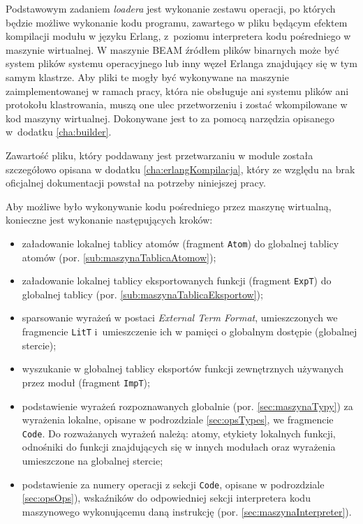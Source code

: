 Podstawowym zadaniem \emph{loadera} jest wykonanie zestawu operacji, po których będzie możliwe wykonanie kodu programu, zawartego w pliku będącym efektem kompilacji modułu w języku Erlang, z~poziomu interpretera kodu pośredniego w maszynie wirtualnej.
W maszynie BEAM źródłem plików binarnych może być system plików systemu operacyjnego lub inny węzeł Erlanga znajdujący się w tym samym klastrze. Aby pliki te mogły być wykonywane na maszynie zaimplementowanej w ramach pracy, która nie obsługuje ani systemu plików ani protokołu klastrowania, muszą one ulec przetworzeniu i zostać wkompilowane w kod maszyny wirtualnej. Dokonywane jest to za pomocą narzędzia opisanego w~dodatku \ref{cha:builder}.

Zawartość pliku, który poddawany jest przetwarzaniu w module została szczegółowo opisana w dodatku \ref{cha:erlangKompilacja}, który ze względu na brak oficjalnej dokumentacji powstał na potrzeby niniejszej pracy.

Aby możliwe było wykonywanie kodu pośredniego przez maszynę wirtualną, konieczne jest wykonanie następujących kroków:
\begin{itemize}
\item załadowanie lokalnej tablicy atomów (fragment \texttt{Atom}) do globalnej tablicy atomów (por. \ref{sub:maszynaTablicaAtomow});
\item załadowanie lokalnej tablicy eksportowanych funkcji (fragment \texttt{ExpT}) do globalnej tablicy (por. \ref{sub:maszynaTablicaEksportow});
\item sparsowanie wyrażeń w postaci \emph{External Term Format}, umieszczonych we fragmencie \texttt{LitT} i~umieszczenie ich w pamięci o globalnym dostępie (globalnej stercie);
\item wyszukanie w globalnej tablicy eksportów funkcji zewnętrznych używanych przez moduł (fragment \texttt{ImpT});
\item podstawienie wyrażeń rozpoznawanych globalnie (por. \ref{sec:maszynaTypy}) za wyrażenia lokalne, opisane w podrozdziale \ref{sec:opsTypes}, we fragmencie \texttt{Code}. Do rozważanych wyrażeń należą: atomy, etykiety lokalnych funkcji, odnośniki do funkcji znajdujących się w innych modułach oraz wyrażenia umieszczone na globalnej stercie;
\item podstawienie za numery operacji z sekcji \texttt{Code}, opisane w podrozdziale \ref{sec:opsOps}), wskaźników do odpowiedniej sekcji interpretera kodu maszynowego wykonującemu daną instrukcję (por. \ref{sec:maszynaInterpreter}).
\end{itemize}

